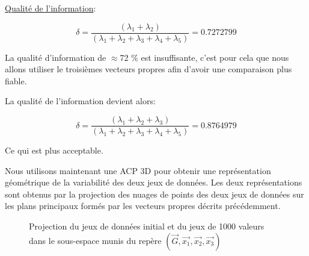 \documentclass[a4paper]{article}
\begin{document}
\underline{Qualité de l'information}:

$$\delta=\frac{(\lambda_{1}+\lambda_{2})}{(\lambda_{1}+\lambda_{2}+\lambda_{3}+\lambda_{4}+\lambda_{5})}=  0.7272799$$

La qualité d'information de $\approx$72 $\%$  est insuffisante, c'est pour cela que nous allons utiliser le troisièmes vecteurs propres afin d'avoir une comparaison plus fiable.

La qualité de l'information devient alors:

$$\delta=\frac{(\lambda_{1}+\lambda_{2}+\lambda_{3})}{(\lambda_{1}+\lambda_{2}+\lambda_{3}+\lambda_{4}+\lambda_{5})}=   0.8764979$$

Ce qui est plus acceptable.


\newpage
Nous utilisons maintenant une ACP 3D pour obtenir une représentation géométrique de la variabilité des deux jeux de données.
Les deux représentations  sont obtenus par la projection des nuages de points des deux jeux de données sur les plans principaux formés par les vecteurs propres décrits précédemment.

\begin{figure}[H]
\hfill
{}
\caption{Projection du jeux de données initial et du jeux de 1000 valeurs dans le sous-espace munis du repère $(\vec{G},\vec{x_{1}},\vec{x_{2}},\vec{x_{3}})$}\label{fig:somefiglabel}
\end{figure}
\end{document}
